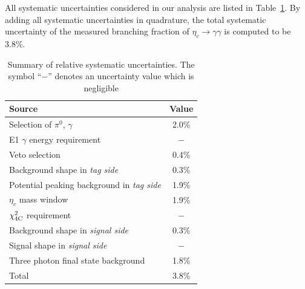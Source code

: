 \documentclass[twocolumn,showpacs,aps,prl]{revtex4-2}
\begin{document}
All systematic uncertainties considered in our analysis are listed in Table~\ref{tab:sys_summary}. By adding all systematic uncertainties in quadrature, the total systematic uncertainty of the measured branching fraction of $\eta_c \to \gamma \gamma$ is computed to be 3.8\%.
\begin{table}[htbp]
	\centering

	\caption{Summary of relative systematic uncertainties. The symbol \enquote{$-$} denotes an uncertainty value which is negligible}
	\begin{tabular}{lc}
		\hline
		\hline
		Source																		&	Value		\\
		\hline
		Selection of $\pi^{0}$, $\gamma$											&	2.0\%		\\
		E1 $\gamma$ energy requirement		 										&	$-$			\\
		Veto selection 																&	0.4\%		\\
		Background shape in \textit{tag side}										&	0.3\%		\\
		Potential peaking background in \textit{tag side}					&	1.9\%		\\
		$\eta_c$ mass window														&	1.9\%		\\
		$\chi^{2}_{\rm 4C}$ requirement												&	$-$			\\
		Background shape in \textit{signal side}									&	0.3\%		\\
		Signal shape in \textit{signal side} 										&    $-$ 		\\
		Three photon final state background									&	1.8\%		\\
		\hline
		Total																		&	3.8\%		\\
		\hline
		\hline
	\end{tabular}
	\label{tab:sys_summary}
\end{table}
\end{document}
